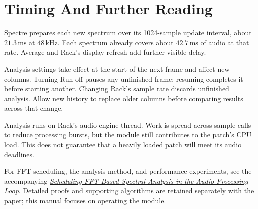 \section{Timing And Further Reading}\label{sec:further-reading}

Spectre prepares each new spectrum over its 1024-sample update interval,
about $21.3\,\mathrm{ms}$ at $48\,\mathrm{kHz}$. Each spectrum already covers
about $42.7\,\mathrm{ms}$ of audio at that rate. Average and Rack's display
refresh add further visible delay.

Analysis settings take effect at the start of the next frame and affect new
columns. Turning Run off pauses any unfinished frame; resuming completes it
before starting another. Changing Rack's sample rate discards unfinished
analysis. Allow new history to replace older columns before comparing results
across that change.

Analysis runs on Rack's audio engine thread. Work is spread across sample
calls to reduce processing bursts, but the module still contributes to the
patch's CPU load. This does not guarantee that a heavily loaded patch will
meet its audio deadlines.

For FFT scheduling, the analysis method, and performance experiments, see
the accompanying
\href{https://github.com/Arhythmetic-Units/Fourier/tree/main/docs/whitepaper}{\textit{Scheduling FFT-Based Spectral Analysis in the Audio Processing Loop}}.
Detailed proofs and supporting algorithms are retained separately with the
paper; this manual focuses on operating the module.
